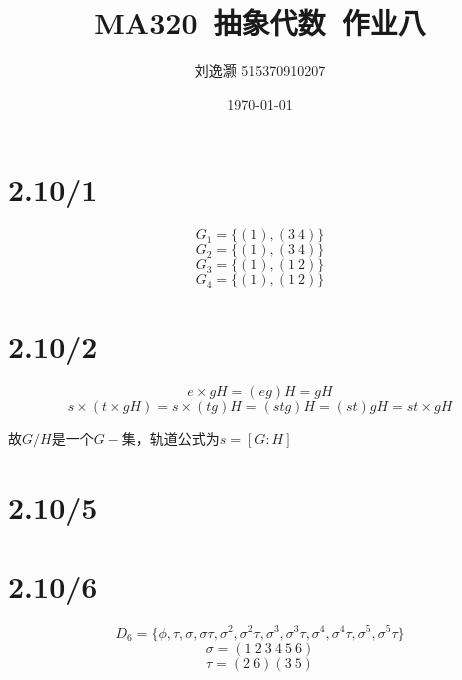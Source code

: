 \documentclass{article}
\title{MA320\ 抽象代数\ 作业八}
\author{刘逸灏 515370910207}
\date{\today}
\begin{document}
\maketitle

\section{2.10/1}
$$G_1=\{(1),(3\ 4)\}$$
$$G_2=\{(1),(3\ 4)\}$$
$$G_3=\{(1),(1\ 2)\}$$
$$G_4=\{(1),(1\ 2)\}$$

\section{2.10/2}
$$e\times gH=(eg)H=gH$$
$$s\times(t\times gH)=s\times (tg)H=(stg)H=(st)gH=st\times gH$$

故$G/H$是一个$G-$集，轨道公式为$s=[G:H]$

\section{2.10/5}


\section{2.10/6}
$$D_6=\{\phi,\tau,\sigma,\sigma\tau,\sigma^2,\sigma^2\tau,\sigma^3,\sigma^3\tau,\sigma^4,\sigma^4\tau,\sigma^5,\sigma^5\tau\}$$
$$\sigma=(1\ 2\ 3\ 4\ 5\ 6)$$
$$\tau=(2\ 6)(3\ 5)$$
\end{document}
